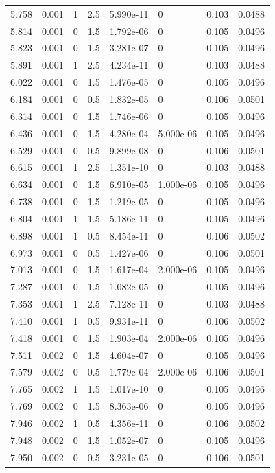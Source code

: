 \documentclass[preview]{standalone}
\begin{document}
{{{\begin{tabular}{L{1.2cm}C{1.2cm} C{0.3cm}C{0.5cm} C{1.4cm}C{1.4cm} C{1.4cm}C{1.4cm}}
  5.758  &  0.001  & 1     & 2.5 &  5.990e-11  & 0  & 0.103 &  0.0488   \\ 
  5.814  &  0.001  & 0     & 1.5 &  1.792e-06  & 0  & 0.105 &  0.0496   \\ 
  5.823  &  0.001  & 0     & 1.5 &  3.281e-07  & 0  & 0.105 &  0.0496   \\ 
  5.891  &  0.001  & 1     & 2.5 &  4.234e-11  & 0  & 0.103 &  0.0488   \\ 
  6.022  &  0.001  & 0     & 1.5 &  1.476e-05  & 0  & 0.105 &  0.0496   \\ 
  6.184  &  0.001  & 0     & 0.5 &  1.832e-05  & 0  & 0.106 &  0.0501   \\ 
  6.314  &  0.001  & 0     & 1.5 &  1.746e-06  & 0  & 0.105 &  0.0496   \\ 
  6.436  &  0.001  & 0     & 1.5 &  4.280e-04  & 5.000e-06  & 0.105 &  0.0496   \\ 
  6.529  &  0.001  & 0     & 0.5 &  9.899e-08  & 0  & 0.106 &  0.0501   \\ 
  6.615  &  0.001  & 1     & 2.5 &  1.351e-10  & 0  & 0.103 &  0.0488   \\ 
  6.634  &  0.001  & 0     & 1.5 &  6.910e-05  & 1.000e-06  & 0.105 &  0.0496   \\ 
  6.738  &  0.001  & 0     & 1.5 &  1.219e-05  & 0  & 0.105 &  0.0496   \\ 
  6.804  &  0.001  & 1     & 1.5 &  5.186e-11  & 0  & 0.105 &  0.0496   \\ 
  6.898  &  0.001  & 1     & 0.5 &  8.454e-11  & 0  & 0.106 &  0.0502   \\ 
  6.973  &  0.001  & 0     & 0.5 &  1.427e-06  & 0  & 0.106 &  0.0501   \\ 
  7.013  &  0.001  & 0     & 1.5 &  1.617e-04  & 2.000e-06  & 0.105 &  0.0496   \\ 
  7.287  &  0.001  & 0     & 1.5 &  1.082e-05  & 0  & 0.105 &  0.0496   \\ 
  7.353  &  0.001  & 1     & 2.5 &  7.128e-11  & 0  & 0.103 &  0.0488   \\ 
  7.410  &  0.001  & 1     & 0.5 &  9.931e-11  & 0  & 0.106 &  0.0502   \\ 
  7.418  &  0.001  & 0     & 1.5 &  1.903e-04  & 2.000e-06  & 0.105 &  0.0496   \\ 
  7.511  &  0.002  & 0     & 1.5 &  4.604e-07  & 0  & 0.105 &  0.0496   \\ 
  7.579  &  0.002  & 0     & 0.5 &  1.779e-04  & 2.000e-06  & 0.106 &  0.0501   \\ 
  7.765  &  0.002  & 1     & 1.5 &  1.017e-10  & 0  & 0.105 &  0.0496   \\ 
  7.769  &  0.002  & 0     & 1.5 &  8.363e-06  & 0  & 0.105 &  0.0496   \\ 
  7.946  &  0.002  & 1     & 0.5 &  4.356e-11  & 0  & 0.106 &  0.0502   \\ 
  7.948  &  0.002  & 0     & 1.5 &  1.052e-07  & 0  & 0.105 &  0.0496   \\ 
  7.950  &  0.002  & 0     & 0.5 &  3.231e-05  & 0  & 0.106 &  0.0501   \\ 
\hline 
\end{tabular} 

}}}
\end{document}
